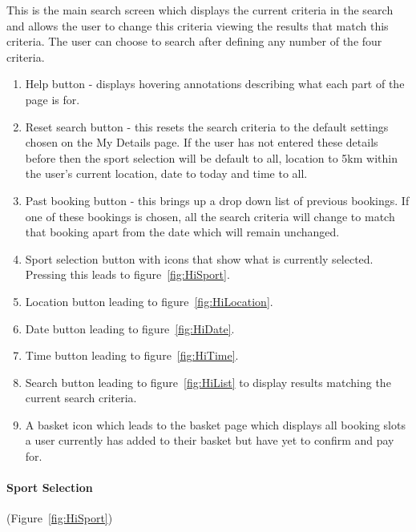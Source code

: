 This is the main search screen which displays the current criteria
in the search and allows the user to change this criteria viewing
the results that match this criteria. The user can choose to search
after defining any number of the four criteria.
\begin{enumerate}
	\item Help button - displays hovering annotations describing what each part
	      of the page is for.
	\item Reset search button - this resets the search criteria to the default
	      settings chosen on the My Details page. If the user has not entered
	      these details before then the sport selection will be default to all,
	      location to 5km within the user's current location, date to today
	      and time to all.
	\item Past booking button - this brings up a drop down list of previous
	      bookings. If one of these bookings is chosen, all the search criteria
	      will change to match that booking apart from the date which will remain
	      unchanged.
	\item Sport selection button with icons that show what is currently selected.
	      Pressing this leads to figure~\ref{fig:HiSport}.
	\item Location button leading to figure~\ref{fig:HiLocation}.
	\item Date button leading to figure~\ref{fig:HiDate}.
	\item Time button leading to figure~\ref{fig:HiTime}.
	\item Search button leading to figure~\ref{fig:HiList} to display results
	      matching the current search criteria.
	\item A basket icon which leads to the basket page which displays all booking
	      slots a user currently has added to their basket but have yet to confirm
	      and pay for.
\end{enumerate}

\paragraph{Sport Selection}

(Figure~\ref{fig:HiSport})

